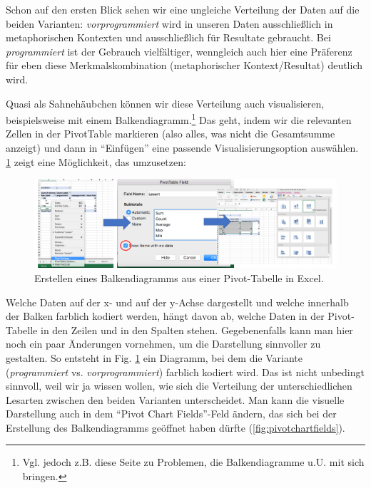 \documentclass[]{article}
\let\rmarkdownfootnote\footnote%
\def\footnote{\protect\rmarkdownfootnote}
\begin{document}
Schon auf den ersten Blick sehen wir eine ungleiche Verteilung der Daten
auf die beiden Varianten: \emph{vorprogrammiert} wird in unseren Daten
ausschließlich in metaphorischen Kontexten und ausschließlich für
Resultate gebraucht. Bei \emph{programmiert} ist der Gebrauch
vielfältiger, wenngleich auch hier eine Präferenz für eben diese
Merkmalskombination (metaphorischer Kontext/Resultat) deutlich wird.

Quasi als Sahnehäubchen können wir diese Verteilung auch visualisieren,
beispielsweise mit einem Balkendiagramm.\footnote{Vgl. jedoch z.B. diese
  Seite zu Problemen, die Balkendiagramme u.U. mit sich bringen.} Das
geht, indem wir die relevanten Zellen in der PivotTable markieren (also
alles, was nicht die Gesamtsumme anzeigt) und dann in \enquote{Einfügen}
eine passende Visualisierungsoption auswählen. \ref{fig:excelvisualize}
zeigt eine Möglichkeit, das umzusetzen:

\begin{figure}
\includegraphics[width=6.66in]{docs/fig/excel_visualize} \caption{Erstellen eines Balkendiagramms aus einer Pivot-Tabelle in Excel.}\label{fig:excelvisualize}
\end{figure}

Welche Daten auf der x- und auf der y-Achse dargestellt und welche
innerhalb der Balken farblich kodiert werden, hängt davon ab, welche
Daten in der Pivot-Tabelle in den Zeilen und in den Spalten stehen.
Gegebenenfalls kann man hier noch ein paar Änderungen vornehmen, um die
Darstellung sinnvoller zu gestalten. So entsteht in Fig.
\ref{fig:excelvisualize} ein Diagramm, bei dem die Variante
(\emph{programmiert} vs. \emph{vorprogrammiert}) farblich kodiert wird.
Das ist nicht unbedingt sinnvoll, weil wir ja wissen wollen, wie sich
die Verteilung der unterschiedlichen Lesarten zwischen den beiden
Varianten unterscheidet. Man kann die visuelle Darstellung auch in dem
\enquote{Pivot Chart Fields}-Feld ändern, das sich bei der Erstellung
des Balkendiagramms geöffnet haben dürfte (\ref{fig:pivotchartfields}).
\end{document}
